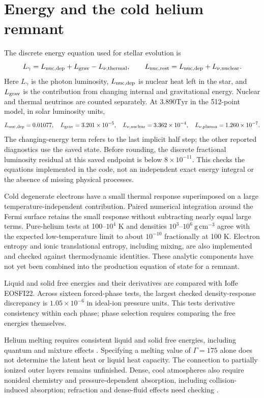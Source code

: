 \documentclass[11pt,letterpaper]{article}
\newcommand{\Tyr}{\mathrm{Tyr}}
\begin{document}
\section{Energy and the cold helium remnant}
The discrete energy equation used for stellar evolution is
\[
 L_\gamma=L_{\rm nuc,dep}+L_{\rm grav}-L_{\nu,\rm thermal},\qquad
 L_{\rm nuc,rest}=L_{\rm nuc,dep}+L_{\nu,\rm nuclear}.
\]
Here $L_\gamma$ is the photon luminosity, $L_{\rm nuc,dep}$ is nuclear heat
left in the star, and $L_{\rm grav}$ is the contribution from changing internal
and gravitational energy. Nuclear and thermal neutrinos are counted separately.
At $3.890\Tyr$ in the 512-point model, in solar luminosity units,
\[
 L_{\rm nuc,dep}=0.01077,\quad
 L_{\rm grav}=3.201\times10^{-5},\quad
 L_{\nu,\rm nuclear}=3.362\times10^{-4},\quad
 L_{\nu,\rm plasma}=1.260\times10^{-7}.
\]
The changing-energy term refers to the last implicit half step; the other
reported diagnostics use the saved state. Before rounding, the discrete
fractional luminosity residual at this saved endpoint is below $8\times10^{-11}$. This checks the equations implemented
in the code, not an independent exact energy integral or the absence of
missing physical processes.

Cold degenerate electrons have a small thermal response superimposed on a
large temperature-independent contribution. Paired numerical integration
around the Fermi surface retains the small response without subtracting
nearly equal large terms. Pure-helium tests at 100--$10^4$ K and densities
$10^3$--$10^6\ \mathrm{g\,cm^{-3}}$ agree with the expected low-temperature
limit to about $10^{-10}$ fractionally at 100 K. Electron entropy and ionic
translational entropy, including mixing, are also implemented and checked
against thermodynamic identities. These analytic components have not yet been
combined into the production equation of state for a remnant.

Liquid and solid free energies and their derivatives are compared with
Ioffe EOSFI22. Across sixteen forced-phase tests, the largest checked
density-response discrepancy is $1.05\times10^{-6}$ in ideal-ion pressure
units. This tests derivative consistency within each phase; phase selection
requires comparing the free energies themselves.

Helium melting requires consistent liquid and solid free energies, including
quantum and mixture effects \cite{baiko22}. Specifying a melting value of
$\Gamma=175$ alone does not determine the latent heat or liquid heat capacity.
The connection to partially ionized outer layers remains unfinished.
Dense, cool atmospheres also require nonideal
chemistry and pressure-dependent absorption, including collision-induced
absorption; refraction and dense-fluid effects need checking \cite{blouin18}.
\end{document}
